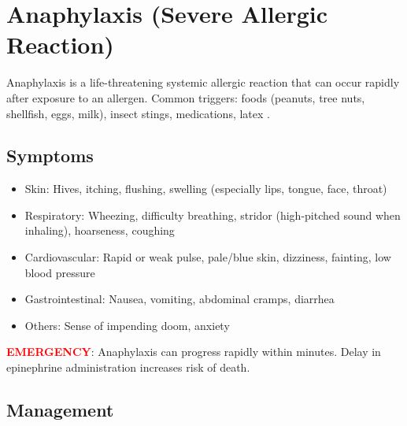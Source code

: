 \section{Anaphylaxis (Severe Allergic Reaction)}

Anaphylaxis is a life-threatening systemic allergic reaction that can occur rapidly after exposure to an allergen. Common triggers: foods (peanuts, tree nuts, shellfish, eggs, milk), insect stings, medications, latex \cite{wao_anaphylaxis_2020}.

\subsection{Symptoms}

\begin{itemize}[leftmargin=*]
  \item Skin: Hives, itching, flushing, swelling (especially lips, tongue, face, throat)
  \item Respiratory: Wheezing, difficulty breathing, stridor (high-pitched sound when inhaling), hoarseness, coughing
  \item Cardiovascular: Rapid or weak pulse, pale/blue skin, dizziness, fainting, low blood pressure
  \item Gastrointestinal: Nausea, vomiting, abdominal cramps, diarrhea
  \item Others: Sense of impending doom, anxiety
\end{itemize}

\noindent\textbf{\textcolor{red}{EMERGENCY}}: Anaphylaxis can progress rapidly within minutes. Delay in epinephrine administration increases risk of death.

\subsection{Management}

